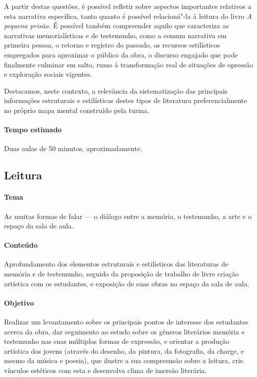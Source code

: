 \documentclass[11pt]{extarticle}
\begin{document}
\begin{enumerate}
A partir destas questões, é possível refletir sobre aspectos importantes
relativos a esta narrativa específica, tanto quanto é possível
relacioná"-la à leitura do livro \emph{A pequena prisão.} É possível
também compreender aquilo que caracteriza as narrativas memorialísticas
e de testemunho, como a comum narrativa em primeira pessoa, o retorno e
registro do passado, os recursos estilísticos empregados para aproximar
o público da obra, o discurso engajado que pode finalmente culminar em
salto, rumo à transformação real de situações de opressão e exploração
sociais vigentes. 

Destacamos, neste contexto, a relevância da
sistematização das principais informações estruturais e estilísticas
destes tipos de literatura preferencialmente no próprio mapa mental
construído pela turma.
\end{enumerate}

\paragraph{Tempo estimado} Duas aulas de 50 minutos,
aproximadamente.


\subsection{Leitura}

\paragraph{Tema} As muitas formas de falar --- o diálogo entre a memória,
o testemunho, a arte e o espaço da sala de aula.

\paragraph{Conteúdo} Aprofundamento dos elementos estruturais e
estilísticos das literaturas de memória e de testemunho, seguido da
proposição de trabalho de livre criação artística com os estudantes, e
exposição de suas obras no espaço da sala de aula.

\paragraph{Objetivo} Realizar um levantamento sobre os principais pontos
de interesse dos estudantes acerca da obra, dar seguimento ao estudo
sobre os gêneros literários memória e testemunho nas suas múltiplas
formas de expressão, e orientar a produção artística dos jovens (através
do desenho, da pintura, da fotografia, da charge, e mesmo da música e
poesia), que ilustre a sua compreensão sobre a leitura, crie vínculos
estéticos com esta e desenvolva clima de imersão literária.
\end{document}
